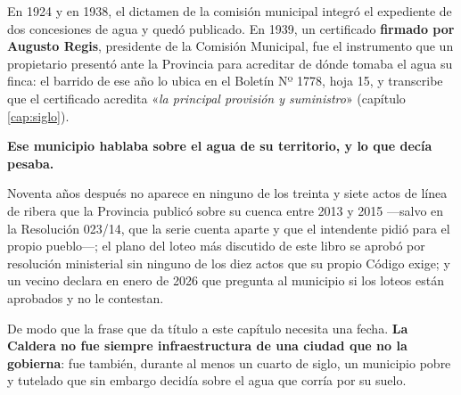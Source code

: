 En 1924 y en 1938, el dictamen de la comisión municipal integró el expediente de dos
concesiones de agua y quedó publicado. En 1939, un certificado \textbf{firmado por Augusto
Regis}, presidente de la Comisión Municipal, fue el instrumento que un
propietario presentó ante la Provincia para acreditar de dónde tomaba el agua su finca: el
barrido de ese año lo ubica en el Boletín Nº 1778, hoja 15, y transcribe que el certificado
acredita «\textit{la principal provisión y suministro}» (capítulo \ref{cap:siglo}).

\textbf{Ese municipio hablaba sobre el agua de su territorio, y lo que decía pesaba.}

Noventa años después no aparece en ninguno de los treinta y siete actos de línea de ribera que la Provincia publicó sobre su cuenca entre 2013 y 2015 ---salvo en la Resolución 023/14, que la serie cuenta aparte y que el intendente pidió para el propio pueblo---; el plano del loteo más discutido de este
libro se aprobó por resolución ministerial sin ninguno de los diez actos que su
propio Código exige; y un vecino declara en enero de 2026 que pregunta al municipio si los
loteos están aprobados y no le contestan.

De modo que la frase que da título a este capítulo necesita una fecha. \textbf{La Caldera no
fue siempre infraestructura de una ciudad que no la gobierna}: fue también, durante al menos
un cuarto de siglo, un municipio pobre y tutelado que sin embargo decidía sobre el agua que
corría por su suelo.

